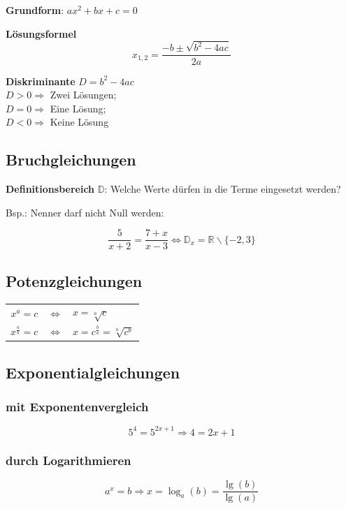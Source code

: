 \begin{multicols}{2}
\textbf{Grundform}: $ax^2 + bx+c = 0$

\begin{tcolorbox}[colback=white]
  \textbf{Lösungsformel}
  $$x_{1,2} = \frac{-b \pm \sqrt{b^2-4ac}}{2a}$$
\end{tcolorbox}
\textbf{Diskriminante} $D = b^2-4ac$\\
$D>0\Longrightarrow$ Zwei Lösungen;\\
$D=0\Longrightarrow$ Eine Lösung;\\
$D<0\Longrightarrow$ Keine Lösung


\subsection*{Bruchgleichungen}

\textbf{Definitionsbereich} $\mathbb{D}$: Welche Werte dürfen in die Terme eingesetzt werden?

Bsp.: Nenner darf nicht Null werden:

$$\frac5{x+2}=\frac{7+x}{x-3} \Leftrightarrow{} \mathbb{D}_x=\mathbb{R}\backslash{}\{-2, 3\}$$

\subsection*{Potenzgleichungen}


\begin{tabular}{rcl}
$x^a=c$ & $\Leftrightarrow$ & $x=\sqrt[a]{c}$\\
$x^{\frac{a}b} = c$&$\Leftrightarrow{}$&$x=c^{\frac{b}a} = \sqrt[a]{c^b}$
\end{tabular}

\subsection*{Exponentialgleichungen}
\subsubsection*{mit Exponentenvergleich}

$$5^4 = 5^{2x+1} \Longrightarrow  4=2x+1$$

\subsubsection*{durch Logarithmieren}
$$a^x=b \Rightarrow{} x=\log_a(b) = \frac{\lg(b)}{\lg(a)}$$



\end{multicols}
